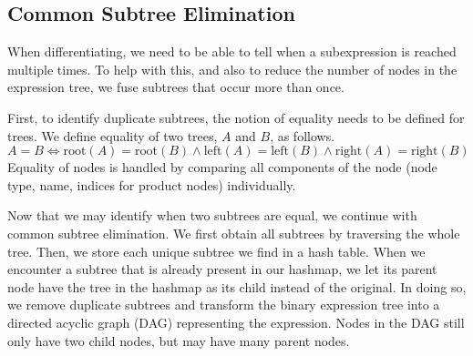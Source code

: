\documentclass[12pt, a4paper]{report}
\begin{document}
\subsection{Common Subtree Elimination}
When differentiating, we need to be able to tell when a subexpression is reached multiple times.
To help with this, and also to reduce the number of nodes in the expression tree, we fuse subtrees that occur more than once.

First, to identify duplicate subtrees, the notion of equality needs to be defined for trees.
We define equality of two trees, $A$ and $B$, as follows.
$$
A = B \iff \text{root}(A) = \text{root}(B) \land \text{left}(A) = \text{left}(B) \land \text{right}(A) = \text{right}(B)
$$
Equality of nodes is handled by comparing all components of the node (node type, name, indices for product nodes) individually.

Now that we may identify when two subtrees are equal, we continue with common subtree elimination.
We first obtain all subtrees by traversing the whole tree.
Then, we store each unique subtree we find in a hash table.
When we encounter a subtree that is already present in our hashmap, we let its parent node have the tree in the hashmap as its child instead of the original.
In doing so, we remove duplicate subtrees and transform the binary expression tree into a directed acyclic graph (DAG) representing the expression.
Nodes in the DAG still only have two child nodes, but may have many parent nodes.
\end{document}
